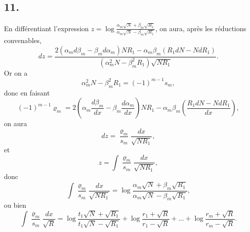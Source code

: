\documentclass[oneside, 12 pt, leqno]{memoir}
\begin{document}
\subsection*{11.}

En différentiant l'expression \(z=\log \frac{\alpha_m \sqrt{N}+\beta_m \sqrt{R_1}}{\alpha_m \sqrt{N}-\beta_m \sqrt{R_1}}\), on aura, après les réductions convenables,
\[d z=\frac{2\left(\alpha_m d \beta_m-\beta_m d \alpha_m\right) N R_1-\alpha_m \beta_m\left(R_1 d N-N d R_1\right)}{\left(\alpha_m^2 N-\beta_m^2 R_1\right) \sqrt{N R_1}}.\]
Or on a
\[\alpha_m^2 N-\beta_m^2 R_1=(-1)^{m-1} s_m,\]
donc en faisant
\[\tag{27}(-1)^{m-1} \varrho_m=2\left(\alpha_m \frac{d \beta_m}{d x}-\beta_m \frac{d \alpha_m}{d x}\right) N R_1-\alpha_m \beta_m\left(\frac{R_1 d N-N d R_1}{d x}\right),\]
on aura
\[d z=\frac{\varrho_m}{s_m} \frac{d x}{\sqrt{N R_1}},\]
et
\[z=\int \frac{\varrho_m}{s_m} \frac{d x}{\sqrt{ N R_1}},\]
donc
\[\int \frac{\varrho_m}{s_m} \frac{d x}{\sqrt{N R_1}}=\log \frac{\alpha_m \sqrt{N}+\beta_m \sqrt{R_1}}{\alpha_m \sqrt{N}-\beta_m \sqrt{ R_1}},\]
ou bien
\[\tag{28}\int \frac{\varrho_m}{s_m} \frac{d x}{\sqrt{R}}=\log \frac{t_1 \sqrt{N}+\sqrt{R_1}}{t_1 \sqrt{N}-\sqrt{R_1}}+\log \frac{r_1+\sqrt{R}}{r_1-\sqrt{ R}}+\dots+\log \frac{r_m+\sqrt{R}}{r_m-\sqrt{ R}}.\]
\end{document}
